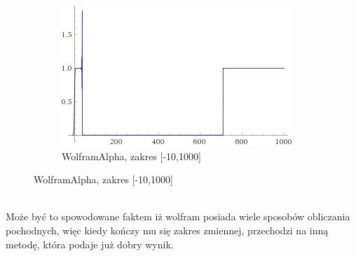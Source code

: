 \documentclass{article}
\begin{document}
\begin{figure}[ht]
	\begin{subfigure}{.5\textwidth}
		\centering
		\includegraphics[width=.8\linewidth]{WolfPlots/Screenshot_2019-11-06 f(x) = (((exp(x)) ((log((1) + (exp(-x))))))) for x range(-10,1000) - Wolfram Alpha}  
		\caption*{WolframAlpha, zakres [-10,1000]}

	\end{subfigure}
\end{figure} \\
Może być to spowodowane faktem iż wolfram posiada wiele sposobów obliczania pochodnych, więc kiedy kończy mu się zakres zmiennej, przechodzi na inną metodę, która podaje już dobry wynik.
\end{document}
